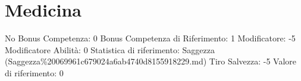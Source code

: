 \section{Medicina}\label{medicina}

\begin{description}
\tightlist
\item[Tags: ABI]
No Bonus Competenza: 0 Bonus Competenza di Riferimento: 1 Modificatore:
-5 Modificatore Abilità: 0 Statistica di riferimento: Saggezza
(Saggezza\%20069961c679024a6ab4740d8155918229.md) Tiro Salvezza: -5
Valore di riferimento: 0
\end{description}
